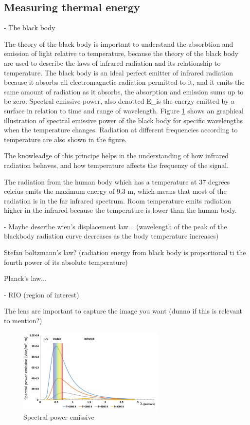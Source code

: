 \subsection{Measuring thermal energy}

- The black body

	The theory of the black body is important to understand the absorbtion and emission of light relative to temperature, because the theory of the black body are used to describe the laws of infrared radiation and its relationship to temperature. The black body is an ideal perfect emitter of infrared radiation because it absorbs all electromagnetic radiation permitted to it, and it emits the same amount of radiation as it absorbs, the absorption and emission sums up to be zero. 
	Spectral emissive power, also denotted E_\lambda is the energy emitted by a surface in relation to time and range of wavelength. Figure \ref{fig:Spectral} shows an graphical illustration of spectral emissive power of the black body for specific wavelengths when the temperature changes. Radiation at different frequencies according to temperature are also shown in the figure. 
	
	The knowleadge of this principe helps in the understanding of how infrared radiation behaves, and how temperature affects the frequenzy of the signal. 
	
	The radiation from the human body which has a temperature at 37 degrees celcius emits the maximum energy of 9.3 \mu m, which means that most of the radiation is in the far infrared spectrum. Room temperature emits radiation higher in the infrared because the temperature is lower than the human body.
	
	- Maybe describe wien's displacement law... (wavelength of the peak of the blackbody radiation curve decreases as the body temperature increases)

	Stefan boltzmann's law? (radiation energy from black body is proportional ti the fourth power of its absolute temperature)
	
	Planck's law...
	
- RIO (region of interest)

	The lens are important to capture the image you want (dunno if this is relevant to mention?)

\begin{figure}[H]
	\centering	\includegraphics[width=0.65\textwidth]{figures/Spectral_power_emissive}
	\caption{Spectral power emissive}
	\label{fig:Spectral}
\end{figure} \vspace{-.3cm}

